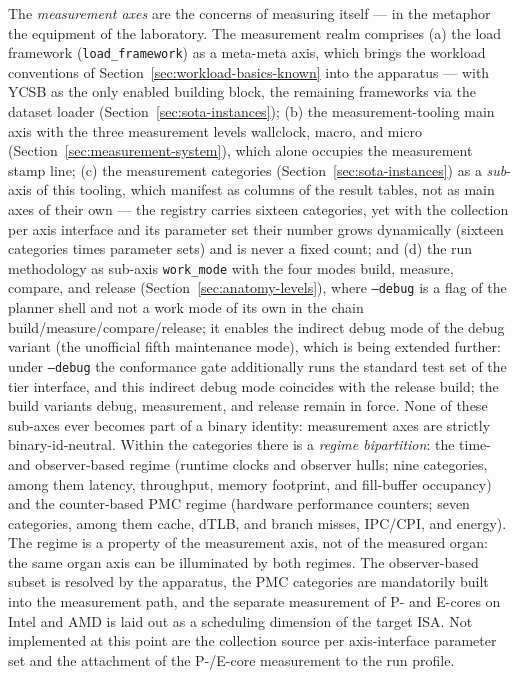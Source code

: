 \begin{nurlang}
The \emph{measurement axes} are the concerns of measuring itself --- in the metaphor the equipment of the
laboratory. The measurement realm comprises (a) the load framework (\texttt{load\_framework}) as a meta-meta axis,
which brings the workload conventions of Section~\ref{sec:workload-basics-known} into the apparatus --- with
YCSB as the only enabled building block, the remaining frameworks via the dataset loader
(Section~\ref{sec:sota-instances}); (b) the measurement-tooling main axis with the three measurement levels
wallclock, macro, and micro (Section~\ref{sec:measurement-system}), which alone occupies the measurement stamp line;
(c) the measurement categories (Section~\ref{sec:sota-instances}) as a \emph{sub}-axis of this
tooling, which manifest as columns of the result tables, not as main axes of their own ---
the registry carries sixteen categories, yet with the collection per axis interface and its
parameter set their number grows dynamically (sixteen categories times parameter sets) and is never a
fixed count; and (d) the run methodology as sub-axis \texttt{work\_mode} with the four modes
build, measure, compare, and release (Section~\ref{sec:anatomy-levels}), where \texttt{--debug} is a flag of the planner shell and not a work mode of its own in the chain
build/measure/compare/release; it enables the indirect debug mode of the debug variant (the unofficial fifth
maintenance mode), which is being extended further: under \texttt{--debug} the conformance gate additionally runs
the standard test set of the tier interface, and this indirect debug mode coincides with the release build; the
build variants debug, measurement, and release remain in force. None of these sub-axes ever
becomes part of a binary identity:
measurement axes are strictly binary-id-neutral. Within the categories there is a
\emph{regime bipartition}: the time- and observer-based regime (runtime clocks and observer hulls;
nine categories, among them latency, throughput, memory footprint, and fill-buffer occupancy) and the
counter-based PMC regime (hardware performance counters; seven categories, among them cache, dTLB, and
branch misses, IPC/CPI, and energy). The regime is a property of the measurement axis, not of the measured
organ: the same organ axis can be illuminated by both regimes. The observer-based
subset is resolved by the apparatus, the PMC categories are mandatorily built into the measurement path, and the
separate measurement of P- and E-cores on Intel and AMD is laid out as a scheduling dimension of the target ISA\@.
Not implemented at this point are the collection source per
axis-interface parameter set and the attachment of the P-/E-core measurement to the run profile.
\end{nurlang}
